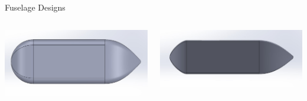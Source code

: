 \documentclass{beamer}
\newcommand{\setpresentername}[1]{\renewcommand{\presentername}{#1}}
\newcommand{\setpresentertitle}[1]{\renewcommand{\presentertitle}{#1}}
\newcommand{\presentername}{}
\newcommand{\presentertitle}{}
\begin{document}
    \setpresentername{Lucas Tavares Vasconcellos}
    \setpresentertitle{Structural Engineer}

\begin{frame}{Fuselage Designs}
    \begin{columns}[T]
            \begin{column}{0.5\textwidth}
                \centering
                \includegraphics[width=\textwidth]{figures/fuselage/Fuselage1.0.0.jpg}
                \vspace{0.5em} %
            \end{column}
    
            \begin{column}{0.5\textwidth}
                \centering
                \includegraphics[width=\textwidth]{figures/fuselage/Fuselage1.2.1.jpg}
                \vspace{0.5em} %
            \end{column}
        \end{columns}
    
        \vspace{1em}
    

\end{frame}
\end{document}

